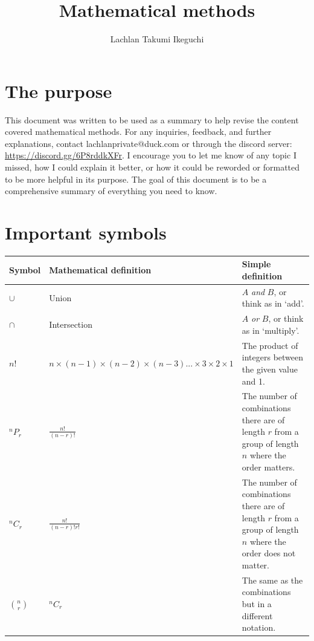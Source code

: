 \documentclass{book}
\title{Mathematical methods}
\author{Lachlan Takumi Ikeguchi}
\begin{document}
\maketitle
\tableofcontents

\section{The purpose}
This document was written to be used as a summary to help revise the content covered mathematical methods.  For any inquiries, feedback, and further explanations, contact lachlanprivate@duck.com or through the discord server: \url{https://discord.gg/6P8rddkXFr}. I encourage you to let me know of any topic I missed, how I could explain it better, or how it could be reworded or formatted to be more helpful in its purpose.  The goal of this document is to be a comprehensive summary of everything you need to know.

\section{Important symbols}
\begin{center}
	\begin{tabular}{l|lp{6cm}}
		Symbol         & Mathematical definition                                                  & Simple definition                                                                                              \\ \hline
		$\cup$         & Union                                                                    & $A$ \emph{and} $B$, or think as in `add'.                                                                      \\
		$\cap$         & Intersection                                                             & $A$ \emph{or} $B$, or think as in `multiply'.                                                                  \\
		$n!$           & $n \times (n-1) \times (n-2) \times (n-3)... \times 3 \times 2 \times 1$ & The product of integers between the given value and 1.                                                         \\
		$^nP_r$        & $\frac{n!}{(n-r)!}$                                                      & The number of combinations there are of length $r$ from a group of length $n$ where the order matters.         \\
		$^nC_r$        & $\frac{n!}{(n-r)!r!}$                                                    & The number of combinations there are of length $r$ from a group of length $n$ where the order does not matter. \\
		$\binom{n}{r}$ & $^nC_r$                                                                  & The same as the combinations but in a different notation.
	\end{tabular}
\end{center}
\end{document}
